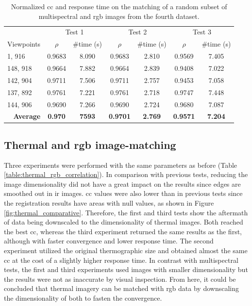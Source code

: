 \renewcommand{\arraystretch}{1.2}
\begin{table}
    \footnotesize
    \caption{Normalized \acrshort{cc} and response time on the matching of a random subset of multispectral and \acrshort{rgb} images from the fourth dataset.}
    \label{table:multispectral_rgb_correlation}
    \begin{tabular}{l|cc|cc|cc}
        \toprule
        \multicolumn{1}{c}{} & \multicolumn{2}{c}{Test 1} & \multicolumn{2}{c}{Test 2} & \multicolumn{2}{c}{Test 3}\\
        \cmidrule{1-7}
        Viewpoints & $\rho$ & \#time (\si{\second}) & $\rho$ & \#time (\si{\second}) & $\rho$ & \#time (\si{\second})\\
        \cmidrule{1-7}
        1, 916 & 0.9683 & 8.090 & 0.9683 & 2.810 & 0.9569 & 7.405\\
        148, 918 & 0.9664 & 7.882 & 0.9664 & 2.839 & 0.9408 & 7.022\\
        142, 904 & 0.9711 & 7.506 & 0.9711 & 2.757 & 0.9453 & 7.058\\ 
        137, 892 & 0.9761 & 7.221 & 0.9761 & 2.718 & 0.9747 & 7.448\\
        144, 906 & 0.9690 & 7.266 & 0.9690 & 2.724 & 0.9680 & 7.087\\
        \cmidrule{1-7}
        \multicolumn{1}{r|}{\textbf{Average}} & \textbf{0.970} & \textbf{7593} & \textbf{0.9701} & \textbf{2.769} & \textbf{0.9571} & \textbf{7.204}\\
        \bottomrule
    \end{tabular}
    \normalsize
\end{table}
\renewcommand{\arraystretch}{1}

\subsection{Thermal and \acrshort{rgb} image-matching}

Three experiments were performed with the same parameters as before (Table \ref{table:thermal_rgb_correlation}). In comparison with previous tests, reducing the image dimensionality did not have a great impact on the results since edges are smoothed out in \acrshort{ir} images. \acrshort{cc} values were also lower than in previous tests since the registration results have areas with null values, as shown in Figure \ref{fig:thermal_comparative}. Therefore, the first and third tests show the aftermath of data being downscaled to the dimensionality of thermal images. Both reached the best \acrshort{cc}, whereas the third experiment returned the same results as the first, although with faster convergence and lower response time. The second experiment utilized the original thermographic size and obtained almost the same \acrshort{cc} at the cost of a slightly higher response time. In contrast with multispectral tests, the first and third experiments used images with smaller dimensionality but the results were not as inaccurate by visual inspection. From here, it could be concluded that thermal imagery can be matched with \acrshort{rgb} data by downscaling the dimensionality of both to fasten the convergence. 

